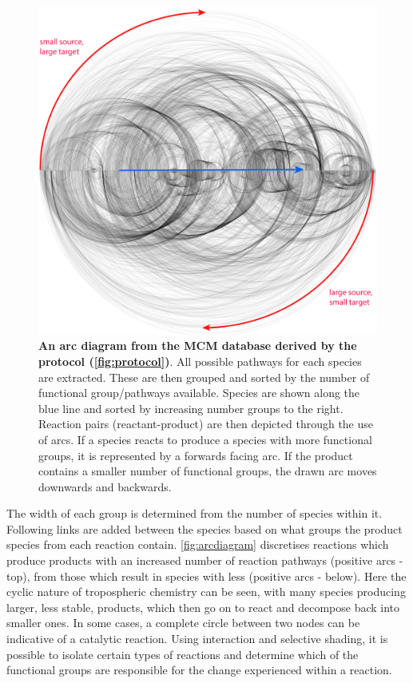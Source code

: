 \begin{figure}[H]
     \centering
     \includegraphics[width=.8\textwidth]{figures_c1/arc/arc_all.png}
     \caption{\textbf{An arc diagram from the MCM database derived by the protocol (\autoref{fig:protocol})}. All possible pathways for each species are extracted. These are then grouped and sorted by the number of functional group/pathways available. Species are shown along the blue line and sorted by increasing number groups to the right. Reaction pairs (reactant-product) are then depicted through the use of arcs. If a species reacts to produce a species with more functional groups, it is represented by a forwards facing arc. If the product contains a smaller number of functional groups, the drawn arc moves downwards and backwards.}
     \label{fig:arcdiagram}
\end{figure}

The width of each group is determined from the number of species within it. Following links are added between the species based on what groups the product species from each reaction contain. \autoref{fig:arcdiagram} discretises reactions which produce products with an increased number of reaction pathways (positive arcs - top), from those which result in species with less (positive arcs - below). Here the cyclic nature of tropospheric chemistry can be seen, with many species producing larger, less stable, products, which then go on to react and decompose back into smaller ones. In some cases, a complete circle between two nodes can be indicative of a catalytic reaction.  Using interaction and selective shading, it is possible to isolate certain types of reactions and determine which of the functional groups are responsible for the change experienced within a reaction.

